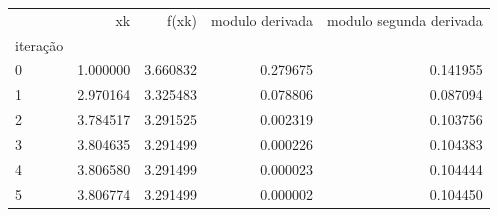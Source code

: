 \begin{tabular}{lrrrr}
\toprule
 & xk & f(xk) & modulo derivada & modulo segunda derivada \\
iteração &  &  &  &  \\
\midrule
0 & 1.000000 & 3.660832 & 0.279675 & 0.141955 \\
1 & 2.970164 & 3.325483 & 0.078806 & 0.087094 \\
2 & 3.784517 & 3.291525 & 0.002319 & 0.103756 \\
3 & 3.804635 & 3.291499 & 0.000226 & 0.104383 \\
4 & 3.806580 & 3.291499 & 0.000023 & 0.104444 \\
5 & 3.806774 & 3.291499 & 0.000002 & 0.104450 \\
\bottomrule
\end{tabular}
